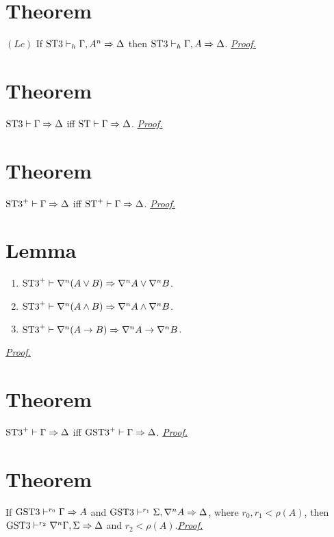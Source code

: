 \documentclass[a4paper, 12pt]{paper}
\begin{document}
\section{Theorem}\label{thm:stt-lc-elim} $(Lc)$ If $\text{ST3} \vdash_h \Gamma, A^n \Rightarrow \Delta$ then $\text{ST3} \vdash_h \Gamma, A \Rightarrow \Delta$.
\hyperref[pr:stt-lc-elim]{\emph{Proof.}}



\section{Theorem}\label{thm:stt-eq-st} $\text{ST3} \vdash \Gamma \Rightarrow \Delta$ iff $\text{ST} \vdash \Gamma \Rightarrow \Delta$.
\hyperref[pr:stt-eq-st]{\emph{Proof.}}



\section{Theorem}\label{thm:sttp-eq-stp} $\text{ST3}^+ \vdash \Gamma \Rightarrow \Delta$ iff $\text{ST}^+ \vdash \Gamma \Rightarrow \Delta$.
\hyperref[pr:sttp-eq-stp]{\emph{Proof.}}



\section{Lemma}\label{lem:l-nabla-dist}
\begin{enumerate}
  \item $\text{ST3}^+ \vdash \nabla^n (A \vee B) \Rightarrow \nabla^n A \vee \nabla^n B$.

  \item $\text{ST3}^+ \vdash \nabla^n (A \wedge B) \Rightarrow \nabla^n A \wedge \nabla^n B$. 

  \item $\text{ST3}^+ \vdash \nabla^n (A \rightarrow B) \Rightarrow \nabla^n A \rightarrow \nabla^n B$.
\end{enumerate}
\hyperref[pr:l-nabla-dist]{\emph{Proof.}}



\section{Theorem}\label{thm:sttp-eq-gsttp} $\text{ST3}^+ \vdash \Gamma \Rightarrow \Delta$ iff $\text{GST3}^+ \vdash \Gamma \Rightarrow \Delta$. \hyperref[pr:sttp-eq-gsttp]{\emph{Proof.}}



\section{Theorem}\label{thm:gstt-cut-reduction}
If $\text{GST3} \vdash^{r_0} \Gamma \Rightarrow A$ and $\text{GST3} \vdash^{r_1} \Sigma , \nabla^n A \Rightarrow \Delta$, where $r_0, r_1 < \rho(A)$, then $\text{GST3} \vdash^{r_2} \nabla^n \Gamma, \Sigma \Rightarrow \Delta$ and $r_2 < \rho(A)$.\hyperref[pr:gstt-cut-reduction]{\emph{Proof.}}
\end{document}
